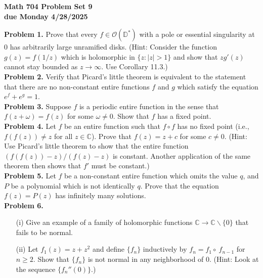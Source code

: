 \documentclass[12pt]{amsart}
\newcommand{\sm}{\smallsetminus}
\newcommand{\OO}{{\mathcal O}}
\newcommand{\CC}{{\mathbb C}}
\newcommand{\vs}{\vspace{2mm}}
\newcommand{\Dstar}{{\mathbb  D}^*}
\begin{document}
\begin{center}
{\bf \large Math 704 Problem Set 9} \vs \\
{\bf due Monday 4/28/2025} \vs \vs
\end{center}

\noindent
{\bf Problem 1.} Prove that every $f \in \OO(\Dstar)$ with a pole or essential singularity at $0$ has arbitrarily large unramified disks. (Hint: Consider the function $g(z)=f(1/z)$ which is holomorphic in $\{ z: |z|>1 \}$ and show that $zg'(z)$ cannot stay bounded as $z \to \infty$. Use Corollary 11.3.) \\ 

\noindent
{\bf Problem 2.} Verify that Picard's little theorem is equivalent to the statement that there are no non-constant entire functions $f$ and $g$ which satisfy the equation $e^f+e^g=1$. \\ 

\noindent
{\bf Problem 3.} Suppose $f$ is a periodic entire function in the sense that $f(z+\omega)=f(z)$ for some $\omega \neq 0$. Show that $f$ has a fixed point. \\

\noindent
{\bf Problem 4.} Let $f$ be an entire function such that $f \circ f$ has no fixed point (i.e., $f(f(z)) \neq z$ for all $z \in \CC$). Prove that $f(z)=z+c$ for some $c \neq 0$. (Hint: Use Picard's little theorem to show that the entire function $(f(f(z))-z)/(f(z)-z)$ is constant. Another application of the same theorem then shows that $f'$ must be constant.) \\ 

\noindent
{\bf Problem 5.} Let $f$ be a non-constant entire function which omits the value $q$, and $P$ be a polynomial which is not identically $q$. Prove that the equation $f(z)=P(z)$ has infinitely many solutions. \\

\noindent
{\bf Problem 6.} 
\begin{enumerate}
\item[(i)]
Give an example of a family of holomorphic functions $\CC \to \CC \sm \{ 0 \}$ that fails to be normal. \vs 
\item[(ii)]
Let $f_1(z)=z+z^2$ and define $\{ f_n \}$ inductively by $f_n=f_1 \circ \ f_{n-1}$ for $n \geq 2$. Show that $\{ f_n \}$ is not normal in any neighborhood of $0$. (Hint: Look at the sequence $\{ f_n''(0) \}$.)
\end{enumerate}
\end{document}
